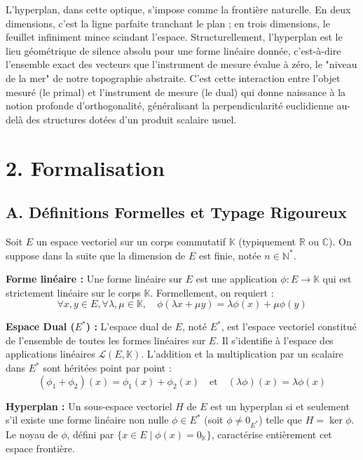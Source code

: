 \documentclass[11pt,a4paper]{report}
\begin{document}
L'hyperplan, dans cette optique, s'impose comme la frontière naturelle. En deux dimensions, c'est la ligne parfaite tranchant le plan ; en trois dimensions, le feuillet infiniment mince scindant l'espace. Structurellement, l'hyperplan est le lieu géométrique de silence absolu pour une forme linéaire donnée, c'est-à-dire l'ensemble exact des vecteurs que l'instrument de mesure évalue à zéro, le "niveau de la mer" de notre topographie abstraite. C'est cette interaction entre l'objet mesuré (le primal) et l'instrument de mesure (le dual) qui donne naissance à la notion profonde d'orthogonalité, généralisant la perpendicularité euclidienne au-delà des structures dotées d'un produit scalaire usuel.

\section{2. Formalisation}

\subsection{A. Définitions Formelles et Typage Rigoureux}

Soit $E$ un espace vectoriel sur un corps commutatif $\mathbb{K}$ (typiquement $\mathbb{R}$ ou $\mathbb{C}$). On suppose dans la suite que la dimension de $E$ est finie, notée $n \in \mathbb{N}^*$.

\textbf{Forme linéaire :}
Une forme linéaire sur $E$ est une application $\phi : E \to \mathbb{K}$ qui est strictement linéaire sur le corps $\mathbb{K}$. Formellement, on requiert :
$$\forall x, y \in E, \forall \lambda, \mu \in \mathbb{K}, \quad \phi(\lambda x + \mu y) = \lambda \phi(x) + \mu \phi(y)$$

\textbf{Espace Dual ($E^*$) :}
L'espace dual de $E$, noté $E^*$, est l'espace vectoriel constitué de l'ensemble de toutes les formes linéaires sur $E$. Il s'identifie à l'espace des applications linéaires $\mathcal{L}(E, \mathbb{K})$. L'addition et la multiplication par un scalaire dans $E^*$ sont héritées point par point :
$$(\phi_1 + \phi_2)(x) = \phi_1(x) + \phi_2(x) \quad \text{et} \quad (\lambda \phi)(x) = \lambda \phi(x)$$

\textbf{Hyperplan :}
Un sous-espace vectoriel $H$ de $E$ est un hyperplan si et seulement s'il existe une forme linéaire non nulle $\phi \in E^*$ (soit $\phi \neq 0_{E^*}$) telle que $H = \ker \phi$. Le noyau de $\phi$, défini par $\{x \in E \mid \phi(x) = 0_\mathbb{K}\}$, caractérise entièrement cet espace frontière.
\end{document}

